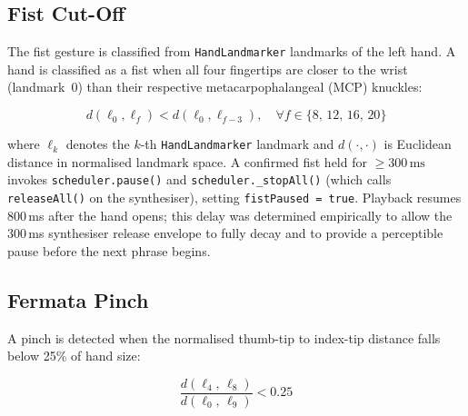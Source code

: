 \documentclass[conference]{IEEEtran}
\begin{document}
\subsection{Fist Cut-Off}

The fist gesture is classified from \texttt{HandLandmarker} landmarks
of the left hand. A hand is classified as a fist when all four
fingertips are closer to the wrist (landmark~0) than their respective
metacarpophalangeal (MCP) knuckles:

\begin{equation}
  d(\ell_0, \ell_f) < d(\ell_0, \ell_{f-3}),
  \quad \forall f \in \{8,\,12,\,16,\,20\}
  \label{eq:fist}
\end{equation}

\noindent where $\ell_k$ denotes the $k$-th \texttt{HandLandmarker}
landmark and $d(\cdot,\cdot)$ is Euclidean distance in normalised
landmark space. A confirmed fist held for $\geq 300\,\text{ms}$ invokes
\texttt{scheduler.pause()} and \texttt{scheduler.\_stopAll()} (which
calls \texttt{releaseAll()} on the synthesiser), setting
\texttt{fistPaused = true}. Playback resumes 800\,ms after the hand
opens; this delay was determined empirically to allow the 300\,ms
synthesiser release envelope to fully decay and to provide a perceptible
pause before the next phrase begins.

\subsection{Fermata Pinch}
\label{sec:fermata}

A pinch is detected when the normalised thumb-tip to index-tip distance
falls below 25\% of hand size:

\begin{equation}
  \frac{d(\ell_4,\, \ell_8)}{d(\ell_0,\, \ell_9)} < 0.25
  \label{eq:pinch}
\end{equation}
\end{document}
